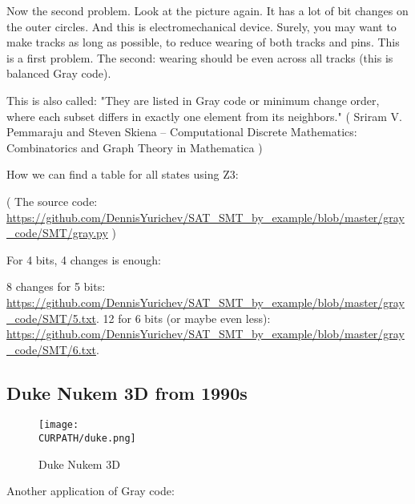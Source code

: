 Now the second problem. Look at the picture again. It has a lot of bit changes on the outer circles.
And this is electromechanical device.
Surely, you may want to make tracks as long as possible, to reduce wearing of both tracks and pins.
This is a first problem.
The second: wearing should be even across all tracks (this is balanced Gray code).

This is also called:
"They are listed in Gray code or minimum change order, where each subset differs in exactly one element from its neighbors."
( Sriram V. Pemmaraju and Steven Skiena -- Computational Discrete Mathematics: Combinatorics and Graph Theory in Mathematica )

How we can find a table for all states using Z3:



( The source code: \url{https://github.com/DennisYurichev/SAT_SMT_by_example/blob/master/gray_code/SMT/gray.py} )

For 4 bits, 4 changes is enough:



8 changes for 5 bits: \url{https://github.com/DennisYurichev/SAT_SMT_by_example/blob/master/gray_code/SMT/5.txt}.
12 for 6 bits (or maybe even less): 
\url{https://github.com/DennisYurichev/SAT_SMT_by_example/blob/master/gray_code/SMT/6.txt}.

\subsection{Duke Nukem 3D from 1990s}

\begin{figure}[H]
\centering
\texttt{[image: \\CURPATH/duke.png]}
\caption{Duke Nukem 3D}
\end{figure}

Another application of Gray code:

